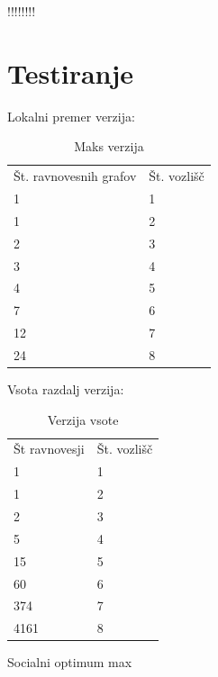 \documentclass[fin1, tisk]{fmfdelo}
\begin{document}
\begin{dokaz}
!!!!!!!!
\end{dokaz}


\section{Testiranje}

Lokalni premer verzija:

\begin{table}[]
\begin{tabular}{ll}
Št. ravnovesnih grafov & Št. vozlišč\\
1                      & 1          \\
1                      & 2          \\
2                      & 3          \\
3                      & 4          \\
4                      & 5          \\
7                      & 6          \\
12                     & 7          \\
24                     & 8          
\end{tabular}
\caption{Maks verzija}
\end{table}

Vsota razdalj verzija:

\begin{table}[]
\begin{tabular}{ll}
Št ravnovesji & Št. vozlišč\\
1             & 1          \\
1             & 2          \\
2             & 3          \\
5             & 4          \\
15            & 5          \\
60            & 6          \\
374           & 7          \\
4161          & 8         
\end{tabular}
\caption{Verzija vsote}
\end{table}




Socialni optimum max \\
\end{document}
